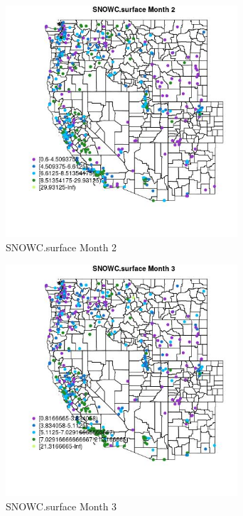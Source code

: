 \begin{figure} 
\centering  
\includegraphics[width=0.77\textwidth]{Code_Outputs/ML_input_report_ML_input_PM25_Step5_part_d_de_duplicated_aves_ML_input_MapObsMo2SNOWCsurface.jpg} 
\caption{\label{fig:ML_input_report_ML_input_PM25_Step5_part_d_de_duplicated_aves_ML_inputMapObsMo2SNOWCsurface}SNOWC.surface Month 2} 
\end{figure} 
 

\begin{figure} 
\centering  
\includegraphics[width=0.77\textwidth]{Code_Outputs/ML_input_report_ML_input_PM25_Step5_part_d_de_duplicated_aves_ML_input_MapObsMo3SNOWCsurface.jpg} 
\caption{\label{fig:ML_input_report_ML_input_PM25_Step5_part_d_de_duplicated_aves_ML_inputMapObsMo3SNOWCsurface}SNOWC.surface Month 3} 
\end{figure} 
 

